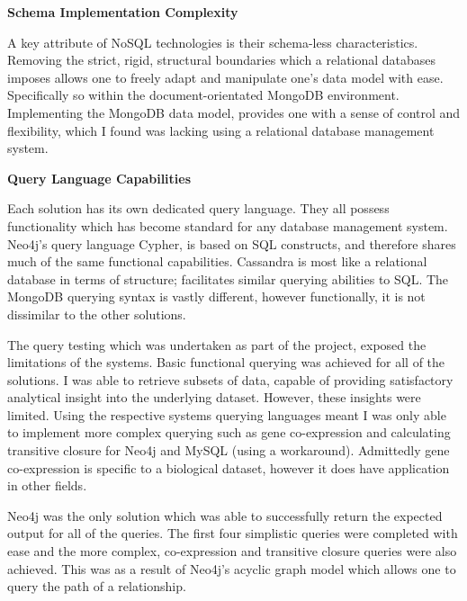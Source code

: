 \textbf{Schema Implementation Complexity}
\begin{addmargin}[2em]{0pt}
A key attribute of NoSQL technologies is their schema-less characteristics. Removing the strict, rigid, structural boundaries which a relational databases imposes allows one to freely adapt and manipulate one's data model with ease. Specifically so within the document-orientated MongoDB environment. Implementing the MongoDB data model, provides one with a sense of control and flexibility, which I found was lacking using a relational database management system.\\[0.5em]
\end{addmargin}

\textbf{Query Language Capabilities}
\begin{addmargin}[2em]{0pt}
Each solution has its own dedicated query language. They all possess functionality which has become standard for any database management system. Neo4j's query language Cypher, is based on SQL constructs, and therefore shares much of the same functional capabilities. Cassandra is most like a relational database in terms of structure; facilitates similar querying abilities to SQL. The MongoDB querying syntax is vastly different, however functionally, it is not dissimilar to the other solutions.

The query testing which was undertaken as part of the project, exposed the limitations of the systems. Basic functional querying was achieved for all of the solutions. I was able to retrieve subsets of data, capable of providing satisfactory analytical insight into the underlying dataset. However, these insights were limited. Using the respective systems querying languages meant I was only able to implement more complex querying such as gene co-expression and calculating transitive closure for Neo4j and MySQL (using a workaround). Admittedly gene co-expression is specific to a biological dataset, however it does have application in other fields.

Neo4j was the only solution which was able to successfully return the expected output for all of the queries. The first four simplistic queries were completed with ease and the more complex, co-expression and transitive closure queries were also achieved. This was as a result of Neo4j's acyclic graph model which allows one to query the path of a relationship.


\end{addmargin}
